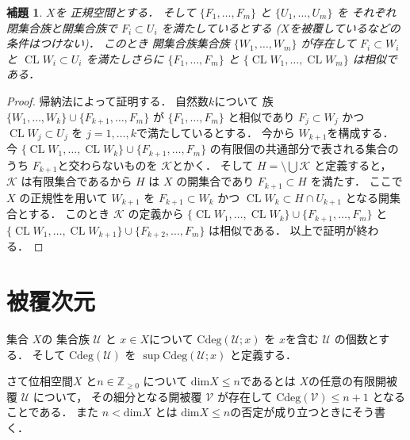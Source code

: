 \documentclass[leqno, a4paper, 12pt]{jsarticle}
\newtheorem{lem}[thm]{補題}
\newcommand{\zz}{\mathbb{Z}}
\DeclareMathOperator{\cl}{CL}
\newcommand{\yodim}{\mathrm{dim}}
\newcommand{\yodeg}{\mathrm{Cdeg}}
\numberwithin{equation}{section}
\begin{document}
\begin{lem}\label{lem:souji}
$X$を
正規空間とする．
そして
$\{F_{1}, \dots, F_{m}\}$
と
$\{U_{1}, \dots, U_{m}\}$
を
それぞれ
閉集合族と開集合族で
$F_{i}\subset U_{i}$
を満たしているとする
($X$を被覆しているなどの条件はつけない)．
このとき
開集合族集合族
$\{W_{1}, \dots, W_{m}\}$
が存在して
$F_{i}\subset W_{i}$
と
$\cl W_{i}\subset U_{i}$
を満たしさらに
$\{F_{1}, \dots, F_{m}\}$
と
$\{\cl W_{1}, \dots, \cl W_{m}\}$
は相似である．
\end{lem}
\begin{proof}
帰納法によって証明する．
自然数$k$について
族
$\{W_{1}, \dots, W_{k}\}\cup \{F_{k+1}, \dots, F_{m}\}$
が
$\{F_{1}, \dots, F_{m}\}$
と相似であり
$F_{j}\subset W_{j}$
かつ
$\cl W_{j}\subset U_{j}$
を
$j=1, \dots, k$で満たしているとする．
今から
$W_{k+1}$を構成する．
今
$\{\cl W_{1}, \dots, \cl W_{k}\}\cup \{F_{k+1}, \dots, F_{m}\}$
の有限個の共通部分で表される集合のうち
$F_{k+1}$と交わらないものを
$\mathcal{K}$とかく．
そして
$H=\setminus \bigcup\mathcal{K}$
と定義すると，
$\mathcal{K}$
は有限集合であるから
$H$
は
$X$
の開集合であり
$F_{k+1}\subset H$
を満たす．
ここで
$X$
の正規性を用いて
$W_{k+1}$
を
$F_{k+1}\subset W_{k}$
かつ
$\cl W_{k}\subset H\cap U_{k+1}$
となる開集合とする．
このとき
$\mathcal{K}$
の定義から
$\{\cl W_{1}, \dots, \cl W_{k}\}\cup \{F_{k+1}, \dots, F_{m}\}$
と
$\{\cl W_{1}, \dots, \cl W_{k+1}\}\cup \{F_{k+2}, \dots, F_{m}\}$
は相似である．
以上で証明が終わる．
\end{proof}






\section{被覆次元}

集合
$X$の
集合族
$\mathcal{U}$
と
$x\in X$について
$\yodeg(\mathcal{U}; x)$
を
$x$を含む
$\mathcal{U}$
の個数とする．
そして
$\yodeg({\mathcal{U}})$
を
$\sup \yodeg(\mathcal{U}; x)$
と定義する．

さて位相空間$X$
と$n\in \zz_{\ge 0}$
について
$\yodim X\le n$であるとは
$X$の任意の有限開被覆
$\mathcal{U}$
について，
その細分となる開被覆
$\mathcal{V}$
が存在して
$\yodeg(\mathcal{V})\le n+1$
となることである．
また
$n<\yodim X$
とは
$\yodim X\le n$の否定が成り立つときにそう書く．
\end{document}
